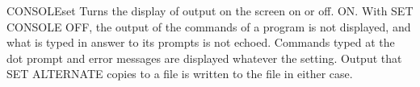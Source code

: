 \begin{XbaseEntry}{CONSOLE}{set}
Turns the display of output on the screen on or off.
\Syntax
{}
\Defaults
ON.
\Usage
With SET CONSOLE OFF, the output of the commands of a program is not
displayed, and what is typed in answer to its prompts is not echoed.
Commands typed at the dot prompt and error messages are displayed whatever
the setting.  Output that SET ALTERNATE copies to a file is written to the
file in either case.
\end{XbaseEntry}

